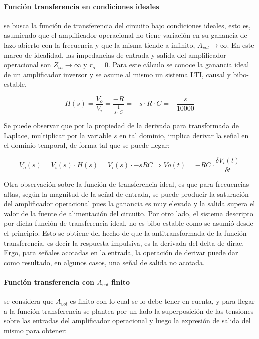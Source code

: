 \paragraph*{Funci\'on transferencia en condiciones ideales}se busca la funci\'on de transferencia del circuito bajo condiciones ideales, esto es, asumiendo que el amplificador operacional no tiene variaci\'on en su ganancia de lazo abierto con la frecuencia y que la misma tiende a infinito, $A_{vol} \to \infty$. En este marco de idealidad, las impedancias de entrada y salida del amplificador operacional son $Z_{in} \to \infty$ y $r_o = 0$. Para este c\'alculo se conoce la ganancia ideal de un amplificador inversor y se asume al mismo un sistema LTI, causal y bibo-estable.

\begin{equation}
	H(s) = \frac{V_o}{V_i} = \frac{-R}{ \frac{1}{s \cdot C}} = -s \cdot R  \cdot C
	= -\frac{s}{10000}
	\label{eq:derivador_transfer_ideal}
\end{equation}

Se puede observar que por la propiedad de la derivada para transformada de Laplace, multiplicar por la variable $s$ en tal dominio, implica derivar la señal en el dominio temporal, de forma tal que se puede llegar:

\begin{equation*}
	V_o(s) = V_i(s) \cdot H(s) = V_i(s) \cdot -sRC \Rightarrow
	Vo(t) = -RC \cdot \frac{\delta V_i(t)}{\delta t}
\end{equation*}

Otra observaci\'on sobre la funci\'on de transferencia ideal, es que para frecuencias altas, 
seg\'un la magnitud de la se\~nal de entrada, se puede producir la saturaci\'on del amplificador
operacional pues la ganancia es muy elevada y la salida supera el valor de la fuente de 
alimentaci\'on del circuito. Por otro lado, el sistema descripto por dicha funci\'on de 
transferencia ideal, no es bibo-estable como se asumi\'o desde el principio. 
Esto se obtiene del hecho de que la antitransformada de la funci\'on transferencia, es decir la respuesta impulsiva, 
es la derivada del delta de dirac. Ergo, para se\~nales acotadas en la entrada, la operaci\'on de derivar
puede dar como resultado, en algunos casos, una se\~nal de salida no acotada.


\paragraph*{Funci\'on transferencia con $A_{vol}$ finito}se considera que $A_{vol}$ es finito con lo cual se lo debe tener en cuenta, y para llegar a la funci\'on transferencia se plantea por un lado la superposici\'on de las tensiones sobre las entradas del amplificador operacional y luego la expresi\'on de salida del mismo para obtener:

